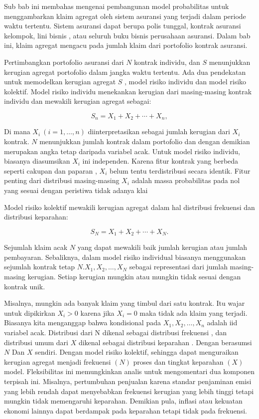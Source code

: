 \documentclass[
]{book}
\begin{document}
Sub bab ini membahas mengenai pembangunan model probabilitas untuk menggambarkan klaim agregat oleh sistem asuransi yang terjadi dalam periode waktu tertentu. Sistem asuransi dapat berupa polis tunggal, kontrak asuransi kelompok, lini bisnis , atau seluruh buku bisnis perusahaan asuransi. Dalam bab ini, klaim agregat mengacu pada jumlah klaim dari portofolio kontrak asuransi.

Pertimbangkan portofolio asuransi dari \(N\) kontrak individu, dan \(S\) menunjukkan kerugian agregat portofolio dalam jangka waktu tertentu. Ada dua pendekatan untuk memodelkan kerugian agregat \(S\) , model risiko individu dan model risiko kolektif. Model risiko individu menekankan kerugian dari masing-masing kontrak individu dan mewakili kerugian agregat sebagai:

\[S_n=X_1 +X_2 +\cdots+X_n,\]

Di mana \(X_i~(i=1,\ldots,n)\) diinterpretasikan sebagai jumlah kerugian dari \(X_i\) kontrak. \(N\) menunjukkan jumlah kontrak dalam portofolio dan dengan demikian merupakan angka tetap daripada variabel acak. Untuk model risiko individu, biasanya diasumsikan \(X_i\) ini independen. Karena fitur kontrak yang berbeda seperti cakupan dan paparan , \(X_i\) belum tentu terdistribusi secara identik. Fitur penting dari distribusi masing-masing \(X_i\) adalah massa probabilitas pada nol yang sesuai dengan peristiwa tidak adanya klai

Model risiko kolektif mewakili kerugian agregat dalam hal distribusi frekuensi dan distribusi keparahan:

\[S_N=X_1 +X_2 + \cdots + X_N .\]

Sejumlah klaim acak \(N\) yang dapat mewakili baik jumlah kerugian atau jumlah pembayaran. Sebaliknya, dalam model risiko individual biasanya menggunakan sejumlah kontrak tetap \(N\).\(X_1, X_2, \ldots, X_N\) sebagai representasi dari jumlah masing-masing kerugian. Setiap kerugian mungkin atau mungkin tidak sesuai dengan kontrak unik.

Misalnya, mungkin ada banyak klaim yang timbul dari satu kontrak. Itu wajar untuk dipikirkan \(X_i>0\) karena jika \(X_i=0\) maka tidak ada klaim yang terjadi. Biasanya kita menganggap bahwa kondisional pada \(X_{1},X_{2},\ldots ,X_{n}\) adalah iid variabel acak. Distribusi dari N dikenal sebagai distribusi frekuensi , dan distribusi umum dari \(X\) dikenal sebagai distribusi keparahan . Dengan berasumsi \(N\) Dan \(X\) sendiri. Dengan model risiko kolektif, sehingga dapat menguraikan kerugian agregat menjadi frekuensi \(( N )\) proses dan tingkat keparahan \(( X )\) model. Fleksibilitas ini memungkinkan analis untuk mengomentari dua komponen terpisah ini. Misalnya, pertumbuhan penjualan karena standar penjaminan emisi yang lebih rendah dapat menyebabkan frekuensi kerugian yang lebih tinggi tetapi mungkin tidak memengaruhi keparahan. Demikian pula, inflasi atau kekuatan ekonomi lainnya dapat berdampak pada keparahan tetapi tidak pada frekuensi.
\end{document}
